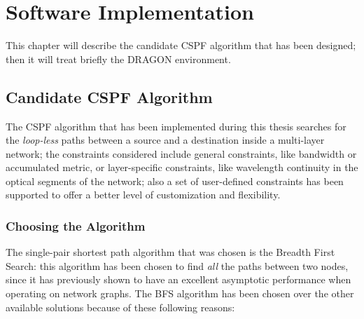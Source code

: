 \documentclass[10pt,a4paper]{report}
\begin{document}
\clearpage
\mbox{}
\clearpage

\chapter{Software Implementation}\label{sec:softimpl}

This chapter will describe the candidate CSPF algorithm that has been
designed; then it will treat briefly the DRAGON environment.

\section{Candidate CSPF Algorithm}

The CSPF algorithm that has been implemented during this thesis
searches for the \textit{loop-less} paths between a source and a
destination inside a multi-layer network; the constraints considered
include general constraints, like bandwidth or accumulated metric, or
layer-specific constraints, like wavelength continuity in the optical
segments of the network; also a set of user-defined constraints has
been supported to offer a better level of customization and
flexibility.

\subsection{Choosing the Algorithm}

The single-pair shortest path algorithm that was chosen is the
Breadth First Search: this algorithm has been chosen to find
\textit{all} the paths between two nodes, since it has previously
shown to have an excellent asymptotic performance when operating on
network graphs. The BFS algorithm has been chosen over the other
available solutions because of these following reasons:
\end{document}
